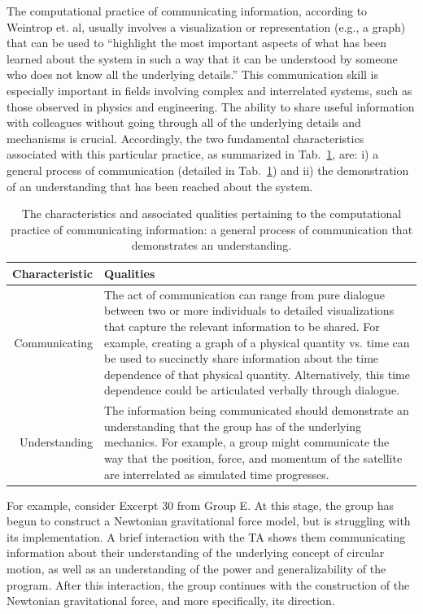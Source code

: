 \documentclass{msuphddissertation}
\begin{document}
\begin{doublespace}
The computational practice of communicating information, according to Weintrop et. al, usually involves a visualization or representation (e.g., a graph) that can be used to ``highlight the most important aspects of what has been learned about the system in such a way that it can be understood by someone who does not know all the underlying details.''  This communication skill is especially important in fields involving complex and interrelated systems, such as those observed in physics and engineering.  The ability to share useful information with colleagues without going through all of the underlying details and mechanisms is crucial.  Accordingly, the two fundamental characteristics associated with this particular practice, as summarized in Tab.~\ref{CH5:CommunicatingInformation}, are: i) a general process of communication (detailed in Tab.~\ref{CH5:CommunicatingInformation}) and ii) the demonstration of an understanding that has been reached about the system.

\begin{table}
\begin{tabular}{r|p{}}
Characteristic & Qualities \\\hline\hline
Communicating & The act of communication can range from pure dialogue between two or more individuals to detailed visualizations that capture the relevant information to be shared.  For example, creating a graph of a physical quantity vs. time can be used to succinctly share information about the time dependence of that physical quantity.  Alternatively, this time dependence could be articulated verbally through dialogue.\\
Understanding & The information being communicated should demonstrate an understanding that the group has of the underlying mechanics.  For example, a group might communicate the way that the position, force, and momentum of the satellite are interrelated as simulated time progresses.\\
\end{tabular}\caption{The characteristics and associated qualities pertaining to the computational practice of communicating information: a general process of communication that demonstrates an understanding.}\label{CH5:CommunicatingInformation}
\end{table}

For example, consider Excerpt 30 from Group E.  At this stage, the group has begun to construct a Newtonian gravitational force model, but is struggling with its implementation.  A brief interaction with the TA shows them communicating information about their understanding of the underlying concept of circular motion, as well as an understanding of the power and generalizability of the program.  After this interaction, the group continues with the construction of the Newtonian gravitational force, and more specifically, its direction.


\end{doublespace}
\end{document}
